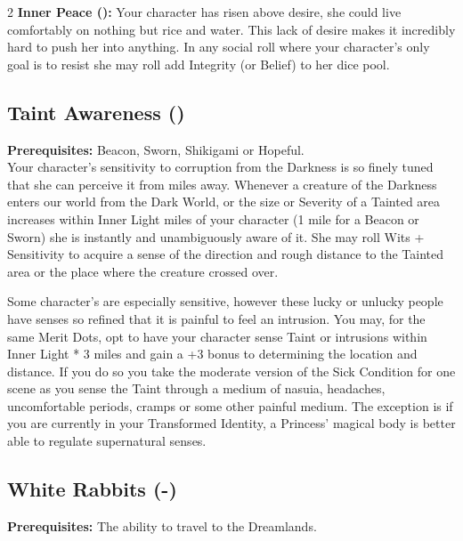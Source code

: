 \begin{multicols}{2}
\textbf{Inner Peace (\textbullet\textbullet\textbullet\textbullet\textbullet):} Your character has risen above desire, she could live comfortably on nothing but rice and water. This lack of desire makes it incredibly hard to push her into anything. In any social roll where your character's only goal is to resist she may roll add Integrity (or Belief) to her dice pool.

\subsection*{Taint Awareness (\textbullet\textbullet)}
\textbf{Prerequisites:} Beacon, Sworn, Shikigami or Hopeful.\\

\noindent Your character's sensitivity to corruption from the Darkness is so finely tuned that she can perceive it from miles away. Whenever a creature of the Darkness enters our world from the Dark World, or the size or Severity of a Tainted area increases within Inner Light miles of your character (1 mile for a Beacon or Sworn) she is instantly and unambiguously aware of it. She may roll Wits + Sensitivity to acquire a sense of the direction and rough distance to the Tainted area or the place where the creature crossed over.

Some character's are especially sensitive, however these lucky or unlucky people have senses so refined that it is painful to feel an intrusion. You may, for the same Merit Dots, opt to have your character sense Taint or intrusions within Inner Light * 3 miles and gain a +3 bonus to determining the location and distance. If you do so you take the moderate version of the Sick Condition for one scene as you sense the Taint through a medium of nasuia, headaches, uncomfortable periods, cramps or some other painful medium. The exception is if you are currently in your Transformed Identity, a Princess' magical body is better able to regulate supernatural senses.

\subsection*{White Rabbits (\textbullet\nobreak\hspace{.16667em}-\nobreak\hspace{.16667em}\textbullet\textbullet\textbullet\textbullet\textbullet)}

\textbf{Prerequisites:} The ability to travel to the Dreamlands.\\


\end{multicols}
